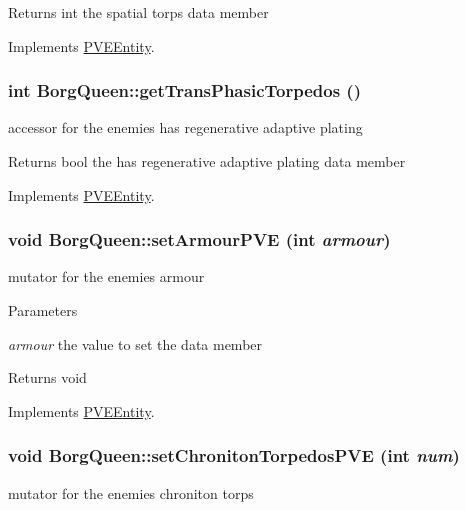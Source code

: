 \begin{DoxyReturn}{Returns}
int the spatial torps data member 
\end{DoxyReturn}


Implements \hyperlink{classPVEEntity}{PVEEntity}.

\hypertarget{classBorgQueen_a1d23b2f941324cb88de797090a40a406}{
\subsubsection[{getTransPhasicTorpedos}]{\setlength{\rightskip}{0pt plus 5cm}int BorgQueen::getTransPhasicTorpedos ()}}
\label{d6/d8d/classBorgQueen_a1d23b2f941324cb88de797090a40a406}
accessor for the enemies has regenerative adaptive plating

\begin{DoxyReturn}{Returns}
bool the has regenerative adaptive plating data member 
\end{DoxyReturn}


Implements \hyperlink{classPVEEntity}{PVEEntity}.

\hypertarget{classBorgQueen_a0aa26287b343e1b26179d1ffd903c2f5}{
\subsubsection[{setArmourPVE}]{\setlength{\rightskip}{0pt plus 5cm}void BorgQueen::setArmourPVE (int {\em armour})}}
\label{d6/d8d/classBorgQueen_a0aa26287b343e1b26179d1ffd903c2f5}
mutator for the enemies armour


\begin{DoxyParams}{Parameters}
\item[{\em armour}]the value to set the data member\end{DoxyParams}
\begin{DoxyReturn}{Returns}
void 
\end{DoxyReturn}


Implements \hyperlink{classPVEEntity}{PVEEntity}.

\hypertarget{classBorgQueen_a5fa2745710ae1da9d884066b8d248b9a}{
\subsubsection[{setChronitonTorpedosPVE}]{\setlength{\rightskip}{0pt plus 5cm}void BorgQueen::setChronitonTorpedosPVE (int {\em num})}}
\label{d6/d8d/classBorgQueen_a5fa2745710ae1da9d884066b8d248b9a}
mutator for the enemies chroniton torps


